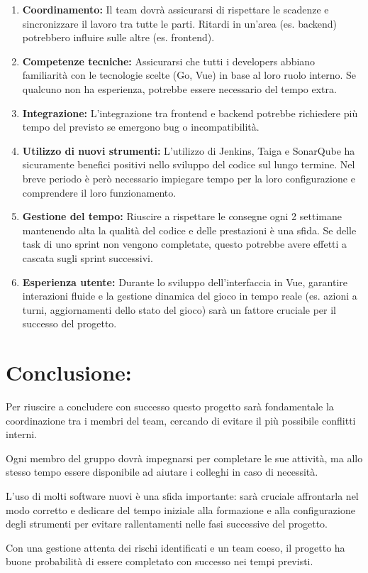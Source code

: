 \documentclass{article}
\begin{document}
\begin{enumerate}
    \item \textbf{Coordinamento:} Il team dovrà assicurarsi di rispettare le scadenze e sincronizzare il lavoro tra tutte le parti. Ritardi in un'area (es. backend) potrebbero influire sulle altre (es. frontend).

   \item \textbf{Competenze tecniche:} Assicurarsi che tutti i developers abbiano familiarità con le tecnologie scelte (Go, Vue) in base al loro ruolo interno. Se qualcuno non ha esperienza, potrebbe essere necessario del tempo extra.

   \item \textbf{Integrazione:} L'integrazione tra frontend e backend potrebbe richiedere più tempo del previsto se emergono bug o incompatibilità.

   \item \textbf{Utilizzo di nuovi strumenti:} L'utilizzo di Jenkins, Taiga e 
     SonarQube ha sicuramente benefici positivi nello sviluppo del codice sul 
     lungo termine. Nel breve periodo è però necessario impiegare tempo per la 
     loro configurazione e comprendere il loro funzionamento.

   \item \textbf{Gestione del tempo:} Riuscire a rispettare le consegne ogni 2 settimane mantenendo alta la qualità del codice e delle prestazioni è una sfida. Se delle task di uno sprint non vengono completate, questo potrebbe avere effetti a cascata sugli sprint successivi.

   \item \textbf{Esperienza utente:} Durante lo sviluppo dell'interfaccia in Vue, garantire interazioni fluide e la gestione dinamica del gioco in tempo reale (es. azioni a turni, aggiornamenti dello stato del gioco) sarà un fattore cruciale per il successo del progetto.
\end{enumerate}

\section{Conclusione:}
    Per riuscire a concludere con successo questo progetto sarà fondamentale la coordinazione tra i membri del team, cercando di evitare il più possibile conflitti interni.
    
    Ogni membro del gruppo dovrà impegnarsi per completare le sue attività, ma allo stesso tempo essere disponibile ad aiutare i colleghi in caso di necessità.
    
    L'uso di molti software nuovi è una sfida importante: sarà cruciale affrontarla nel modo corretto e dedicare del tempo iniziale alla formazione e alla configurazione degli strumenti per evitare rallentamenti nelle fasi successive del progetto.
    
    Con una gestione attenta dei rischi identificati e un team coeso, il progetto ha buone probabilità di essere completato con successo nei tempi previsti.
\end{document}
